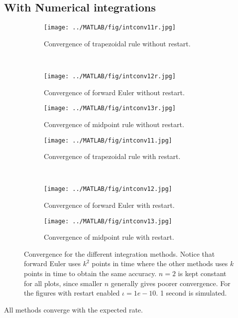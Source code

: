 \subsection{ With Numerical integrations }%
\begin{figure}[H]
        \centering
        \begin{subfigure}[b]{0.30\textwidth}
                \texttt{[image: ../MATLAB/fig/intconv11r.jpg]}
                \caption{ Convergence of trapezoidal rule without restart. }
                \label{fig:intconv11r}
        \end{subfigure}
        ~
        \begin{subfigure}[b]{0.30\textwidth}
                \texttt{[image: ../MATLAB/fig/intconv12r.jpg]}
                \caption{ Convergence of forward Euler without restart. }
                \label{fig:intconv12r}
        \end{subfigure}
        \begin{subfigure}[b]{0.30\textwidth}
                \texttt{[image: ../MATLAB/fig/intconv13r.jpg]}
                \caption{ Convergence of midpoint rule without restart. }
                \label{fig:intconv13r}
        \end{subfigure}         
        
        \begin{subfigure}[b]{0.30\textwidth}
                \texttt{[image: ../MATLAB/fig/intconv11.jpg]}
                \caption{ Convergence of trapezoidal rule with restart. }
                \label{fig:intconv11}
        \end{subfigure}
        ~
        \begin{subfigure}[b]{0.30\textwidth}
                \texttt{[image: ../MATLAB/fig/intconv12.jpg]}
                \caption{ Convergence of forward Euler with restart. }
                \label{fig:intconv12}
        \end{subfigure}
        \begin{subfigure}[b]{0.30\textwidth}
                \texttt{[image: ../MATLAB/fig/intconv13.jpg]}
                \caption{ Convergence of midpoint rule with restart. }
                \label{fig:intconv13}
        \end{subfigure}
        
 
\caption{ Convergence for the different integration methods. Notice that forward Euler uses $k^2$ points in time where the other methods uses $k$ points in time to obtain the same accuracy. $n=2$ is kept constant for all plots, since smaller $n$ generally gives poorer convergence. For the figures with restart enabled $\iota = 1e-10$. 1 second is simulated. }
\label{fig:intconv}
\end{figure}
\noindent All methods converge with the expected rate. \\

